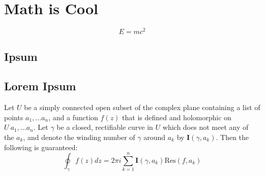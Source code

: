 \documentclass{./scibookneue-screen}
\begin{document}
\chapter{Math is Cool}
\begin{equation}
	E = mc^2
\end{equation}

\lipsum[1-8]
\section{Ipsum}

\lipsum[1]
\lipsum[2]
\lipsum[3]

\lipsum[1]
\lipsum[2]
\lipsum[3]

\lipsum[1]
\marginpar{%

}

\lipsum[2]
\lipsum[3]

\section{Lorem Ipsum}
\lipsum[1]
\begin{mthm}
Let $U$ be a simply connected open subset of the complex plane containing a list of points $a_1, ... a_n$, 
and a function $f(z)$ that is defined and holomorphic on $U \ {a_1,\ldots a_n}$.
Let $\gamma$ be a closed, rectifiable curve in $U$ which does not meet any of the $a_k$, 
and denote the winding number of $\gamma$ around $a_k$ by $\mathbf{I}(\gamma, a_k)$.
Then the following is guaranteed:
\begin{equation}
	\oint_\gamma f(z) dz = 2\pi i \sum_{k=1} ^n \mathbf{I}(\gamma, a_k) \mathrm{Res}\left(f,a_k\right)
\end{equation}
\end{mthm}


\begin{mproof}
	\lipsum[5]
\end{mproof}
\end{document}

